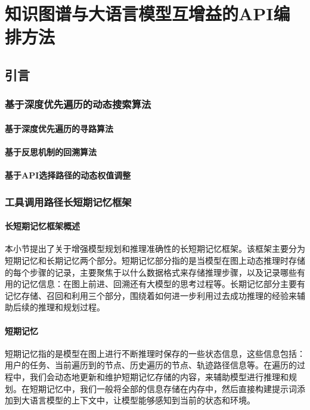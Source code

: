 \chapter{知识图谱与大语言模型互增益的API编排方法}

\section{引言}
\label{sec:intro}
\subsection{基于深度优先遍历的动态搜索算法}
\subsubsection{基于深度优先遍历的寻路算法}
\subsubsection{基于反思机制的回溯算法}
\subsubsection{基于API选择路径的动态权值调整}

\subsection{工具调用路径长短期记忆框架}

\subsubsection{长短期记忆框架概述}

本小节提出了关于增强模型规划和推理准确性的长短期记忆框架。该框架主要分为短期记忆和长期记忆两个部分。短期记忆部分指的是当模型在图上动态推理时存储的每个步骤的记录，主要聚焦于以什么数据格式来存储推理步骤，以及记录哪些有用的记忆信息：在图上前进、回溯还有大模型的思考过程等。长期记忆部分主要有记忆存储、召回和利用三个部分，围绕着如何进一步利用过去成功推理的经验来辅助后续的推理和规划过程。

\subsubsection{短期记忆}

短期记忆指的是模型在图上进行不断推理时保存的一些状态信息，这些信息包括：用户的任务、当前遍历到的节点、历史遍历的节点、轨迹路径信息等。在遍历的过程中，我们会动态地更新和维护短期记忆存储的内容，来辅助模型进行推理和规划。在短期记忆中，我们一般将全部的信息存储在内存中，然后直接构建提示词添加到大语言模型的上下文中，让模型能够感知到当前的状态和环境。

